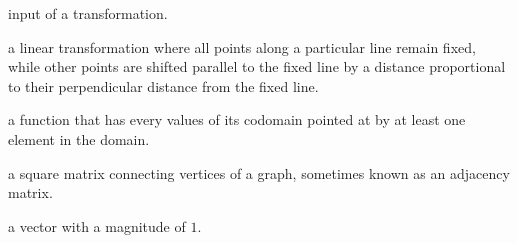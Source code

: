 \documentclass[../textbook.tex]{subfiles}
\begin{document}
\begin{description}[align=left]
\item[preimage] input of a transformation.

\item[shear] a linear transformation where all points along a particular line remain fixed, while other points are shifted parallel to the fixed line by a distance proportional to their perpendicular distance from the fixed line.

\item[surjective function] a function that has every values of its codomain pointed at by at least one element in the domain.

\item[transportation matrix] a square matrix connecting vertices of a graph, sometimes known as an adjacency matrix.

\item[unit vector] a vector with a magnitude of $1$.

\end{description}
\end{document}
